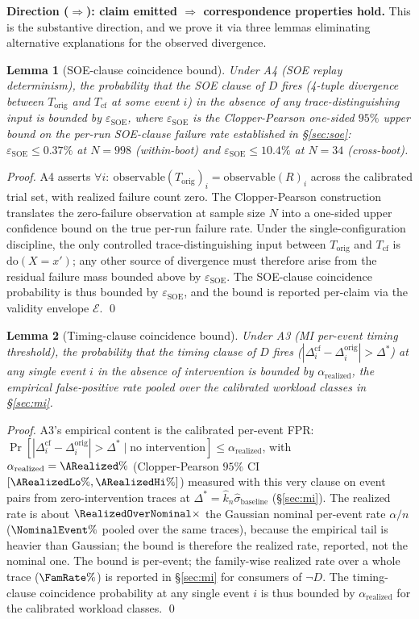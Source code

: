 \documentclass[conference]{IEEEtran}
\newtheorem{lemma}{Lemma}
\newcommand{\Korig}{T_\text{orig}}
\newcommand{\Tcf}{T_\text{cf}}
\newcommand{\sigbase}{\hat{\sigma}_\text{baseline}}
\newcommand{\Dstar}{\Delta^{*}}
\newcommand{\arealized}{\alpha_\text{realized}}
\newcommand{\dox}[1]{\text{do}(X{=}#1)}
\newcommand{\epsSOE}{\varepsilon_\text{SOE}}
\begin{document}
\textbf{Direction ($\Rightarrow$): claim emitted $\Rightarrow$
correspondence properties hold.} This is the substantive
direction, and we prove it via three lemmas eliminating
alternative explanations for the observed divergence.

\begin{lemma}[SOE-clause coincidence bound]
\label{lem:coincidence-soe}
Under A4 (SOE replay determinism), the probability that the SOE
clause of $D$ fires (4-tuple divergence between $\Korig$ and
$\Tcf$ at some event $i$) in the absence of any
trace-distinguishing input is bounded by $\epsSOE$, where
$\epsSOE$ is the Clopper-Pearson one-sided $95\%$ upper bound on
the per-run SOE-clause failure rate established in
\S\ref{sec:soe}: $\epsSOE \leq 0.37\%$ at $N{=}998$ (within-boot)
and $\epsSOE \leq 10.4\%$ at $N{=}34$ (cross-boot).
\end{lemma}

\textit{Proof.} A4 asserts
$\forall i:\ \text{observable}(\Korig)_i = \text{observable}(R)_i$
across the calibrated trial set, with realized failure count zero.
The Clopper-Pearson construction translates the zero-failure
observation at sample size $N$ into a one-sided upper confidence
bound on the true per-run failure rate. Under the
single-configuration discipline, the only controlled
trace-distinguishing input between $\Korig$ and $\Tcf$ is
$\dox{x'}$; any other source of divergence must therefore arise
from the residual failure mass bounded above by $\epsSOE$. The
SOE-clause coincidence probability is thus bounded by $\epsSOE$,
and the bound is reported per-claim via the validity envelope
$\mathcal{E}$. \qed

\begin{lemma}[Timing-clause coincidence bound]
\label{lem:coincidence-timing}
Under A3 (MI per-event timing threshold), the probability that
the timing clause of $D$ fires
($|\Delta_i^{\text{cf}} - \Delta_i^{\text{orig}}| > \Dstar$) at
any single event $i$ in the absence of intervention is bounded by
$\arealized$, the empirical false-positive rate pooled over the
calibrated workload classes in \S\ref{sec:mi}.
\end{lemma}

\textit{Proof.} A3's empirical content is the calibrated
per-event FPR: $\Pr[|\Delta_i^{\text{cf}} -
\Delta_i^{\text{orig}}| > \Dstar \mid \text{no intervention}] \leq
\arealized$, with $\arealized = \ARealized\%$ (Clopper-Pearson $95\%$
CI $[\ARealizedLo\%, \ARealizedHi\%]$) measured with this very clause
on \NullEvents{} event pairs from \NullBoots{} zero-intervention
traces at $\Dstar = \hat{k}_n \sigbase$ (\S\ref{sec:mi}). The realized rate
is about $\RealizedOverNominal\times$ the Gaussian nominal per-event
rate $\alpha/n$ ($\NominalEvent\%$ pooled over the same traces),
because the empirical tail is heavier than Gaussian; the bound is
therefore the realized rate, reported, not the nominal one. The bound
is per-event; the family-wise realized rate over a whole trace
($\FamRate\%$) is reported in \S\ref{sec:mi} for consumers of
$\neg D$. The timing-clause coincidence probability at any single
event $i$ is thus bounded by $\arealized$ for the calibrated workload
classes.
\qed
\end{document}
